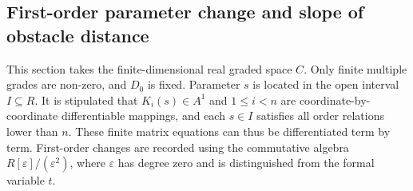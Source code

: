 \documentclass[12pt,a4paper,openany,notitlepage]{report}
\theoremstyle{plain}
\theoremstyle{definition}
\theoremstyle{remark}
\def\mathcal#1{#1}\def\mathsf#1{#1}\def\mathbb#1{#1}%
\begin{document}
\begin{CJK*}
\section { First-order parameter change and slope of obstacle distance }\label{exp:hom:obstruction-slope}


This section takes the finite-dimensional real graded space $C$. Only finite multiple grades are non-zero, and $D_0$ is fixed. Parameter $s$ is located in the open interval $I\subseteq\mathbb R$. It is stipulated that $K_i(s)\in\mathcal A^1$ and $1\le i<n$ are coordinate-by-coordinate differentiable mappings, and each $s\in I$ satisfies all order relations lower than $n$. These finite matrix equations can thus be differentiated term by term. First-order changes are recorded using the commutative algebra $\mathbb R[\varepsilon]/(\varepsilon^2)$, where $\varepsilon$ has degree zero and is distinguished from the formal variable $t$.


\end{CJK*}
\end{document}
